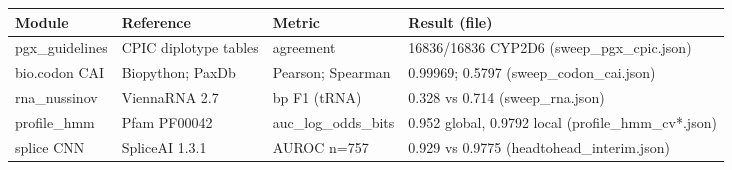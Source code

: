 \begin{center}\small\begin{tabular}{p{3.2cm}p{3.6cm}p{3.2cm}p{4.2cm}}\hline Module & Reference & Metric & Result (file)\\\hline
pgx\_guidelines & CPIC diplotype tables & agreement & 16836/16836 CYP2D6 (sweep\_pgx\_cpic.json)\\
bio.codon CAI & Biopython; PaxDb & Pearson; Spearman & 0.99969; 0.5797 (sweep\_codon\_cai.json)\\
rna\_nussinov & ViennaRNA 2.7 & bp F1 (tRNA) & 0.328 vs 0.714 (sweep\_rna.json)\\
profile\_hmm & Pfam PF00042 & auc\_log\_odds\_bits & 0.952 global, 0.9792 local (profile\_hmm\_cv*.json)\\
splice CNN & SpliceAI 1.3.1 & AUROC n=757 & 0.929 vs 0.9775 (headtohead\_interim.json)\\
\hline\end{tabular}\end{center}
